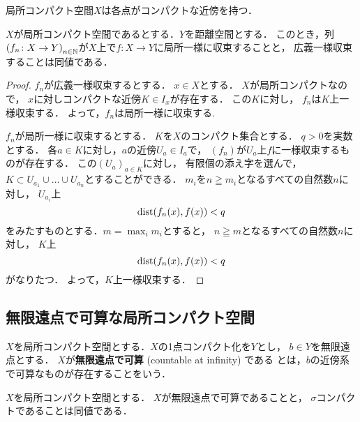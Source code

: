     局所コンパクト空間\(X\)は各点がコンパクトな近傍を持つ．
\begin{PRP}
    \(X\)が局所コンパクト空間であるとする．\(Y\)を距離空間とする．
    このとき，列\(
        \left(f_n\colon X\to Y\right)_{n\in \mathbb{N}}
    \)が\(X\)上で\(f\colon X\to Y\)に局所一様に収束することと，
    広義一様収束することは同値である．
\end{PRP}
\begin{proof}
    \(f_n\)が広義一様収束するとする．
    \(x\in X\)とする．
    \(X\)が局所コンパクトなので，
    \(x\)に対しコンパクトな近傍\(K\in I_x\)が存在する．
    この\(K\)に対し，
    \(f_n\)は\(K\)上一様収束する．
    よって，\(f_n\)は局所一様に収束する.

    \(f_n\)が局所一様に収束するとする．
    \(K\)を\(X\)のコンパクト集合とする．
    \(q>0\)を実数とする．
    各\(a\in K\)に対し，\(a\)の近傍\(U_a\in I_a\)で，
    \((f_n)\)が\(U_a\)上\(f\)に一様収束するものが存在する．
    この\(\left(U_a\right)_{a\in K}\)に対し，
    有限個の添え字を選んで，
    \(K\subset U_{a_1}\cup\dots\cup U_{a_n}\)とすることができる．
    \(m_i\)を\(n\geqq m_i\)となるすべての自然数\(n\)に対し，
    \(U_{a_i}\)上\[
        \mathop{\mathrm{dist}}\nolimits(f_n(x),f(x))<q
    \]をみたすものとする．\(m=\max_i m_i\)とすると，
    \(n\geqq m\)となるすべての自然数\(n\)に対し，
    \(K\)上\[
        \mathop{\mathrm{dist}}\nolimits(f_n(x),f(x))<q
    \]がなりたつ．
    よって，\(K\)上一様収束する．
\end{proof}


\subsection{無限遠点で可算な局所コンパクト空間}

\begin{leftbar}    
    \begin{DFN}
        \(X\)を局所コンパクト空間とする．\(X\)の1点コンパクト化を\(Y\)とし，
        \(b\in Y\)を無限遠点とする．
        \(X\)が\textbf{無限遠点で可算} (countable at infinity) である
        とは，\(b\)の近傍系で可算なものが存在することをいう．
    \end{DFN}
    \end{leftbar}
    


\begin{PRP}
    \(X\)を局所コンパクト空間とする．
    \(X\)が無限遠点で可算であることと，
    \(\sigma\)コンパクトであることは同値である．
\end{PRP}






















